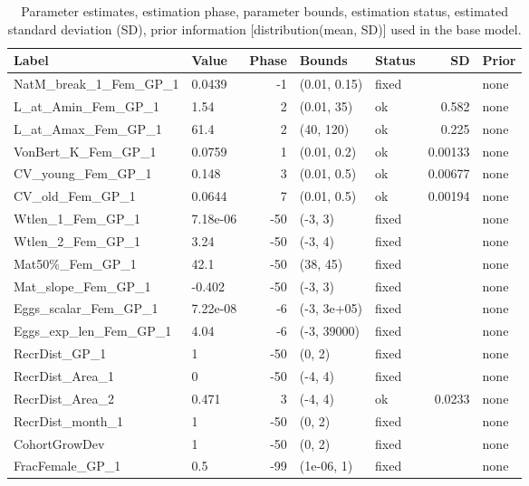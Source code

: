 \documentclass[
]{scrartcl}
\begin{document}
\begin{landscape}
\begingroup
\fontsize{9.0pt}{10.8pt}\selectfont

\begin{longtable}{llrllrl}

\caption{\label{tbl-pars}Parameter estimates, estimation phase,
parameter bounds, estimation status, estimated standard deviation (SD),
prior information {[}distribution(mean, SD){]} used in the base model.}

\tabularnewline

\toprule
Label & Value & Phase & Bounds & Status & SD & Prior \\ 
\midrule\addlinespace[2.5pt]
NatM\_break\_1\_Fem\_GP\_1 & 0.0439 & -1 & (0.01, 0.15) & fixed &  & none \\ 
L\_at\_Amin\_Fem\_GP\_1 & 1.54 & 2 & (0.01, 35) & ok & 0.582 & none \\ 
L\_at\_Amax\_Fem\_GP\_1 & 61.4 & 2 & (40, 120) & ok & 0.225 & none \\ 
VonBert\_K\_Fem\_GP\_1 & 0.0759 & 1 & (0.01, 0.2) & ok & 0.00133 & none \\ 
CV\_young\_Fem\_GP\_1 & 0.148 & 3 & (0.01, 0.5) & ok & 0.00677 & none \\ 
CV\_old\_Fem\_GP\_1 & 0.0644 & 7 & (0.01, 0.5) & ok & 0.00194 & none \\ 
Wtlen\_1\_Fem\_GP\_1 & 7.18e-06 & -50 & (-3, 3) & fixed &  & none \\ 
Wtlen\_2\_Fem\_GP\_1 & 3.24 & -50 & (-3, 4) & fixed &  & none \\ 
Mat50\%\_Fem\_GP\_1 & 42.1 & -50 & (38, 45) & fixed &  & none \\ 
Mat\_slope\_Fem\_GP\_1 & -0.402 & -50 & (-3, 3) & fixed &  & none \\ 
Eggs\_scalar\_Fem\_GP\_1 & 7.22e-08 & -6 & (-3, 3e+05) & fixed &  & none \\ 
Eggs\_exp\_len\_Fem\_GP\_1 & 4.04 & -6 & (-3, 39000) & fixed &  & none \\ 
RecrDist\_GP\_1 & 1 & -50 & (0, 2) & fixed &  & none \\ 
RecrDist\_Area\_1 & 0 & -50 & (-4, 4) & fixed &  & none \\ 
RecrDist\_Area\_2 & 0.471 & 3 & (-4, 4) & ok & 0.0233 & none \\ 
RecrDist\_month\_1 & 1 & -50 & (0, 2) & fixed &  & none \\ 
CohortGrowDev & 1 & -50 & (0, 2) & fixed &  & none \\ 
FracFemale\_GP\_1 & 0.5 & -99 & (1e-06, 1) & fixed &  & none \\ 

\end{longtable}
\end{landscape}
\end{document}
